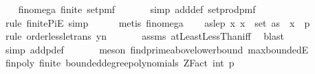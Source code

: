 \begin{isabellebody}
\isanewline
\ \ \isamarkupfalse%
\ fin{\isacharunderscore}{\kern0pt}omega{\isacharunderscore}{\kern0pt}{}{\isacharcolon}{\kern0pt}\ {\isachardoublequoteopen}finite\ {\isacharparenleft}{\kern0pt}set{\isacharunderscore}{\kern0pt}pmf\ {\isasymOmega}\isanewline
\ \ \ \ \isamarkupfalse%
\ {\isacharparenleft}{\kern0pt}simp\ add{\isacharcolon}{\kern0pt}{\isasymOmega}def\ set{\isacharunderscore}{\kern0pt}prod{\isacharunderscore}{\kern0pt}pmf{\isacharparenright}{\kern0pt}\isanewline
\ \ \ \ \isamarkupfalse%
\ {\isacharparenleft}{\kern0pt}rule\ finite{\isacharunderscore}{\kern0pt}PiE{\isacharcomma}{\kern0pt}\ simp{\isacharparenright}{\kern0pt}\isanewline
\ \ \ \ \isamarkupfalse%
\ {\isacharparenleft}{\kern0pt}metis\ fin{\isacharunderscore}{\kern0pt}omega{\isacharunderscore}{\kern0pt}{}{\isacharparenright}{\kern0pt}\isanewline
\isanewline
\ \ \isamarkupfalse%
\ as{\isacharunderscore}{\kern0pt}le{\isacharunderscore}{\kern0pt}p{\isacharcolon}{\kern0pt}\ {\isachardoublequoteopen}{\isasymAnd}x{\isachardot}{\kern0pt}\ x\ {\isasymin}\ set\ as\ {\isasymLongrightarrow}\ x\ {\isacharless}{\kern0pt}\ p{\isachardoublequoteclose}\ \isanewline
\ \ \ \ \isamarkupfalse%
\ {\isacharparenleft}{\kern0pt}rule\ order{\isacharunderscore}{\kern0pt}less{\isacharunderscore}{\kern0pt}le{\isacharunderscore}{\kern0pt}trans{\isacharbrackleft}{\kern0pt}\ y{\isacharequal}{\kern0pt}{\isachardoublequoteopen}n{\isachardoublequoteclose}{\isacharbrackright}{\kern0pt}{\isacharparenright}{\kern0pt}\isanewline
\ \ \ \ \ \isamarkupfalse%
\ assms{\isacharparenleft}{\kern0pt}{}{\isacharparenright}{\kern0pt}\ atLeastLessThan{\isacharunderscore}{\kern0pt}iff\ \isamarkupfalse%
\ blast\isanewline
\ \ \ \ \isamarkupfalse%
\ {\isacharparenleft}{\kern0pt}simp\ add{\isacharcolon}{\kern0pt}p{\isacharunderscore}{\kern0pt}def{\isacharparenright}{\kern0pt}\ \isanewline
\ \ \ \ \isamarkupfalse%
\ {\isacharparenleft}{\kern0pt}meson\ find{\isacharunderscore}{\kern0pt}prime{\isacharunderscore}{\kern0pt}above{\isacharunderscore}{\kern0pt}lower{\isacharunderscore}{\kern0pt}bound\ max{\isachardot}{\kern0pt}boundedE{\isacharparenright}{\kern0pt}\isanewline
\isanewline
\ \ \isamarkupfalse%
\ fin{\isacharunderscore}{\kern0pt}poly{\isacharprime}{\kern0pt}{\isacharcolon}{\kern0pt}\ {\isachardoublequoteopen}finite\ {\isacharparenleft}{\kern0pt}bounded{\isacharunderscore}{\kern0pt}degree{\isacharunderscore}{\kern0pt}polynomials\ {\isacharparenleft}{\kern0pt}ZFact\ {\isacharparenleft}{\kern0pt}int\ p{\isacharparenright}{\kern0pt}{\isacharparenright}{\kern0pt}\ {}{\isacharparenright}{\kern0pt}{\isachardoublequoteclose}\isanewline

\end{isabellebody}
